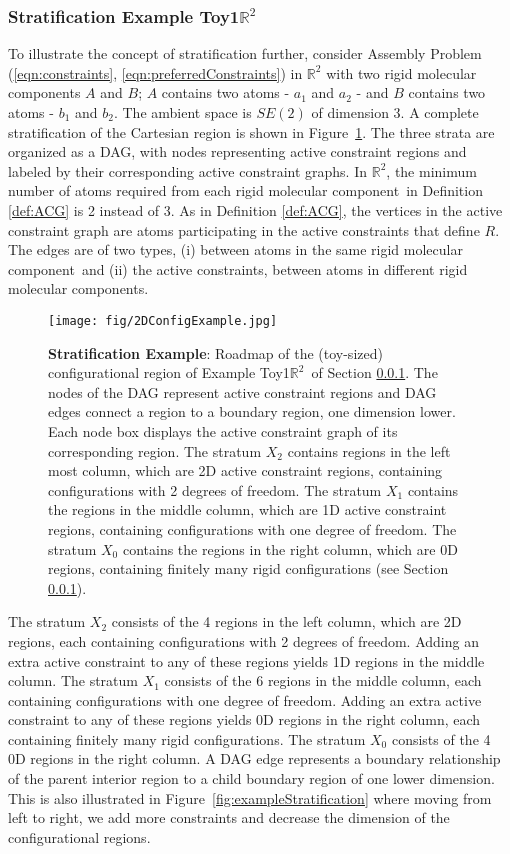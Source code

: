 \documentclass[]{article}
\newcommand{\figref}[1]{Figure~\ref{#1}}
\newcommand{\rmc}{rigid molecular component}
\newcommand{\ctwo}{\ref{eqn:preferredConstraints}}
\newcommand{\cone}{\ref{eqn:constraints}}
\newcommand{\toytwodone}{Toy1$\mathbb{R}^2$}
\newcommand{\psone}{A}
\newcommand{\pstwo}{B}
\newcommand{\pone}{a}
\newcommand{\ptwo}{b}
\begin{document}
\subsubsection{Stratification Example \toytwodone}
\label{sec:toytwodone}
To illustrate the concept of stratification further, consider Assembly Problem
(\cone, \ctwo) in $\mathbb{R}^2$ with two \rmc s $\psone$ and $\pstwo$;
$\psone$ contains two atoms - $\pone_1$ and $\pone_2$ - and
$\pstwo$ contains two atoms - $\ptwo_1$ and $\ptwo_2$. The ambient space is
$SE(2)$ of dimension 3. A complete stratification of the Cartesian region is
shown in \figref{fig:2DToy}. The three strata are organized as a DAG, with
nodes representing active constraint regions and labeled by their corresponding
active constraint graphs. In $\mathbb{R}^2$, the minimum number
of atoms required from each \rmc\ in Definition \ref{def:ACG} is 2 instead of
3. As in Definition \ref{def:ACG}, the vertices in the active constraint graph
are atoms participating in the active constraints that define $R$. The edges
are of two types, (i) between atoms in the same \rmc\ and (ii) the active
constraints, between atoms in different \rmc s.
\begin{figure}[htpb]
\centering
\texttt{[image: fig/2DConfigExample.jpg]}
\caption{\scriptsize \textbf{Stratification Example}: Roadmap of the (toy-sized) configurational
region of Example \toytwodone\ of Section \ref{sec:toytwodone}. 
The nodes of the DAG represent active constraint regions and DAG edges 
connect a region to a boundary region, one dimension lower. Each node 
box displays the active constraint graph of its corresponding region. 
The stratum $X_2$ contains regions in the left most column, which are
2D active constraint regions, containing configurations with 2 degrees
of freedom. The stratum $X_1$ contains the regions in the middle column, 
which are 1D active constraint regions, containing configurations with
one degree of freedom. 
The stratum $X_0$ contains the regions in the right column, which
are 0D regions, containing finitely many rigid configurations
(see Section \ref{sec:toytwodone}). }
\label{fig:2DToy}
\end{figure}

The stratum $X_2$ consists of the 4 regions in the left column, which are 2D
regions, each containing configurations with 2 degrees of freedom.  Adding an
extra active constraint to any of these regions yields 1D regions in the middle
column. The stratum $X_1$ consists of the 6 regions in the middle column, each
containing configurations with one degree of freedom. Adding an extra active
constraint to any of these regions yields 0D regions in the right column, each
containing finitely many rigid configurations.  The stratum $X_0$ consists of
the 4 0D regions in the right column.  A DAG edge represents a boundary
relationship of the parent interior region to a child boundary region of one
lower dimension. This is also illustrated in \figref{fig:exampleStratification}
where moving from left to right, we add more constraints and decrease the
dimension of the configurational regions.
\end{document}
